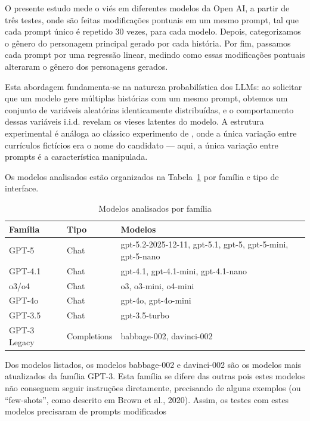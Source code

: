 \documentclass[12pt,a4paper]{article}
\begin{document}
O presente estudo mede o viés em diferentes modelos da Open AI, a partir
de três testes, onde são feitas modificações pontuais em um mesmo
prompt, tal que cada prompt único é repetido 30 vezes, para cada modelo.
Depois, categorizamos o gênero do personagem principal gerado por cada
história. Por fim, passamos cada prompt por uma regressão linear,
medindo como essas modificações pontuais alteraram o gênero dos
personagens gerados.

Esta abordagem fundamenta-se na natureza probabilística dos LLMs: ao
solicitar que um modelo gere múltiplas histórias com um mesmo prompt,
obtemos um conjunto de variáveis aleatórias identicamente distribuídas,
e o comportamento dessas variáveis i.i.d. revelam os vieses latentes do
modelo. A estrutura experimental é análoga ao clássico experimento de
\citet{bertrand2004}, onde a única variação entre currículos
fictícios era o nome do candidato --- aqui, a única variação entre
prompts é a característica manipulada.

Os modelos analisados estão organizados na Tabela~\ref{tab:modelos} por família e tipo de interface.

\begin{table}[H]
\centering
\caption{Modelos analisados por família}
\label{tab:modelos}
\begin{tabular}{lll}
\toprule
\textbf{Família} & \textbf{Tipo} & \textbf{Modelos} \\
\midrule
GPT-5 & Chat & gpt-5.2-2025-12-11, gpt-5.1, gpt-5, gpt-5-mini, gpt-5-nano \\
GPT-4.1 & Chat & gpt-4.1, gpt-4.1-mini, gpt-4.1-nano \\
o3/o4 & Chat & o3, o3-mini, o4-mini \\
GPT-4o & Chat & gpt-4o, gpt-4o-mini \\
GPT-3.5 & Chat & gpt-3.5-turbo \\
GPT-3 Legacy & Completions & babbage-002, davinci-002 \\
\bottomrule
\end{tabular}
\end{table}

Dos modelos listados, os modelos babbage-002 e davinci-002 são os
modelos mais atualizados da família GPT-3. Esta família se difere das
outras pois estes modelos não conseguem seguir instruções diretamente,
precisando de alguns exemplos (ou ``few-shots'', como descrito em Brown et
al., 2020). Assim, os testes com estes modelos precisaram de prompts
modificados
\end{document}
